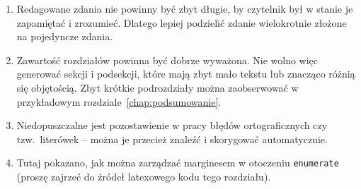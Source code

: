 \begin{enumerate}[labelwidth=\widthof{\ref{last-item}},label=\arabic*.]
\item Redagowane zdania nie powinny być zbyt długie, by czytelnik był w stanie je zapamiętać i zrozumieć. Dlatego lepiej podzielić zdanie wielokrotnie złożone na pojedyncze zdania.
\item Zawartość rozdziałów powinna być dobrze wyważona. Nie wolno więc generować sekcji i podsekcji, które mają zbyt mało tekstu lub znacząco różnią się objętością. Zbyt krótkie podrozdziały można zaobserwować w przykładowym rozdziale~\ref{chap:podsumowanie}.
\item Niedopuszczalne jest pozostawienie w pracy błędów ortograficznych czy tzw.\ literówek -- można je przecież znaleźć i skorygować automatycznie. \addtocounter{enumi}{1000} 
\item  Tutaj pokazano, jak można zarządzać marginesem w otoczeniu \texttt{enumerate} (proszę zajrzeć do źródeł latexowego kodu tego rozdziału). \label{last-item}
\end{enumerate}


